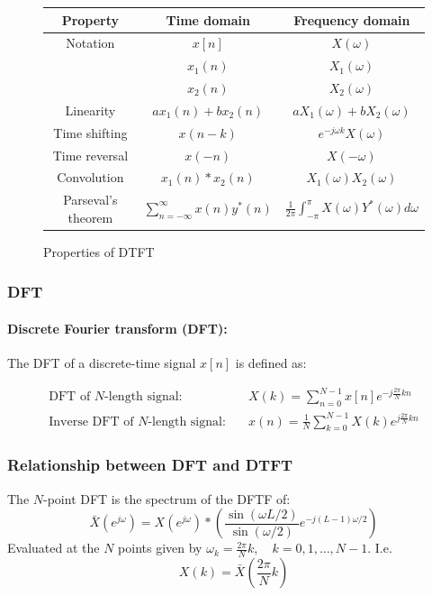 \documentclass{article}
\begin{document}
\begin{figure}[h!]
    \centering
    \begin{tabular}{|c c c|}
        \hline
        Property & Time domain & Frequency domain \\
        \hline
        Notation & $x[n]$ & $X(\omega)$ \\
        & $x_1(n)$ & $X_1(\omega)$ \\
        & $x_2(n)$ & $X_2(\omega)$ \\
        Linearity & $ax_1(n) + bx_2(n)$ & $aX_1(\omega) + bX_2(\omega)$ \\
        Time shifting & $x(n-k)$ & $e^{-j\omega k}X(\omega)$ \\
        Time reversal & $x(-n)$ & $X(-\omega)$ \\
        Convolution & $x_1(n) \ast x_2(n)$ & $X_1(\omega)X_2(\omega)$ \\
        Parseval's theorem & $\sum_{n=-\infty}^{\infty}x(n)y^*(n)$ & $\frac{1}{2\pi}\int_{-\pi}^{\pi}X(\omega)Y^*(\omega)d\omega$ \\
        \hline
    \end{tabular}
    \caption{Properties of DTFT}
    \label{table:DTFT_properties}
\end{figure}

\subsubsection{DFT}
\paragraph{Discrete Fourier transform (DFT):} The DFT of a discrete-time signal $x[n]$ is defined as:

\begin{align}
    \text{DFT of } N\text{-length signal:} \quad & X(k) = \sum_{n=0}^{N-1} x[n]e^{-j\frac{2\pi}{N}kn} \\
    \text{Inverse DFT of } N\text{-length signal:}  \quad & x(n) = \frac{1}{N}\sum_{k=0}^{N-1} X(k)e^{j\frac{2\pi}{N}kn}
\end{align}

\subsubsection{Relationship between DFT and DTFT}

The $N$-point DFT is the spectrum of the DFTF of:
\begin{equation}
    \bar{X}(e^{j\omega}) =X(e^{j\omega}) \ast \left( \frac{\sin (\omega L / 2)}{\sin (\omega/2)}e^{-j(L-1)\omega/2} \right) 
\end{equation}
Evaluated at the $N$ points given by $\omega_k = \frac{2\pi}{N}k, \quad k=0,1,\ldots,N-1$. I.e. 
\begin{equation}
    X(k) = \bar{X}\left( \frac{2\pi}{N}k \right)
\end{equation}
\end{document}
